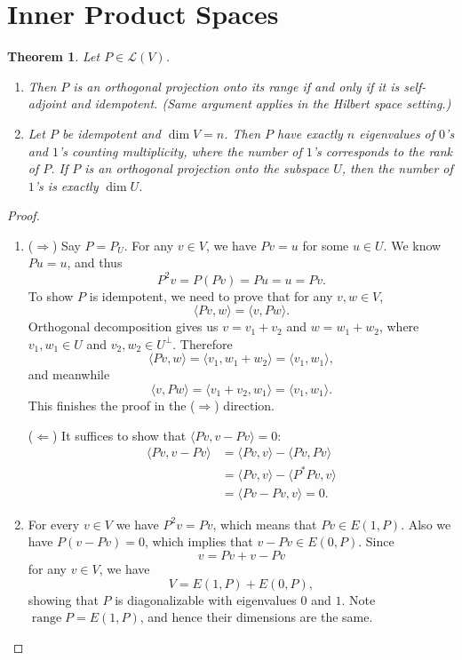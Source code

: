\documentclass[10pt]{article}
\numberwithin{equation}{section}
\theoremstyle{plain-star}
\newtheorem{thm}[equation]{Theorem}
\theoremstyle{definition-star}
\theoremstyle{remark-star}
\theoremstyle{plain-star}
\newcommand{\rng}{\operatorname{range}}
\newcommand{\inp}[2]{\langle #1, #2 \rangle}
\newcommand{\LV}{\mathcal{L}(V)}
\renewcommand{\implies}{\Rightarrow}
\renewcommand{\impliedby}{\Leftarrow}
\begin{document}
\section{Inner Product Spaces}
\begin{thm} Let $P\in \LV$.
    \begin{enumerate}
        \item Then $P$ is an orthogonal projection onto its range if and only if it is self-adjoint and idempotent. (Same argument applies in the Hilbert space setting.)
        \item Let $P$ be idempotent and $\dim V = n$. Then $P$ have exactly $n$ eigenvalues of $0$'s and $1$'s counting multiplicity, where the number of $1$'s corresponds to the rank of $P$. If $P$ is an orthogonal projection onto the subspace $U$, then the number of $1$'s is exactly $\dim U$.
    \end{enumerate}
\end{thm}

\begin{proof}\leavevmode
    \begin{enumerate}
        \item ($\implies$) Say $P=P_U$. For any $v\in V$, we have $Pv = u$ for some $u \in U$. We know $Pu = u$, and thus \[P^2v = P(Pv) = Pu = u = Pv.\] To show $P$ is idempotent, we need to prove that for any $v,w\in V$, \[
            \inp{Pv}{w} = \inp{v}{Pw}.
        \]
        Orthogonal decomposition gives us $v = v_1 + v_2$ and $w = w_1 + w_2$, where $v_1, w_1 \in U$ and $v_2, w_2 \in U^\perp$. Therefore \[
            \inp{Pv}{w} = \inp{v_1}{w_1+w_2} = \inp{v_1}{w_1},
        \] and meanwhile \[
            \inp{v}{Pw} = \inp{v_1+v_2}{w_1} = \inp{v_1}{w_1}.
        \] This finishes the proof in the ($\implies$) direction.

        ($\impliedby$) It suffices to show that $\inp{Pv}{v - Pv} = 0$: \begin{align*}
            \inp{Pv}{v - Pv} & = \inp{Pv}{v} - \inp{Pv}{Pv} \\ 
            & = \inp{Pv}{v} - \inp{P^*Pv}{v} \\
            & = \inp{Pv - Pv}{v} = 0.
        \end{align*}
        \item  For every $v\in V$ we have $P^2 v = Pv$, which means that $Pv \in E(1,P)$. Also we have $P(v - Pv) = 0$, which implies that $v - Pv \in E(0,P)$. Since \[
            v = Pv + v - Pv
        \] for any $v\in V$, we have \[
            V = E(1,P) + E(0,P),
        \] showing that $P$ is diagonalizable with eigenvalues $0$ and $1$. Note $\rng P = E(1,P)$, and hence their dimensions are the same. \qedhere
    \end{enumerate}
\end{proof}
\end{document}
